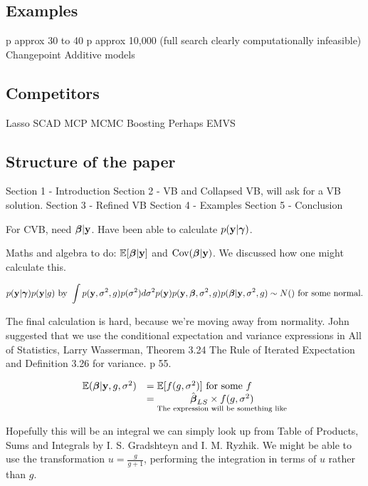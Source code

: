 \documentclass{amsart}
\begin{document}
\subsection{Examples}
p approx 30 to 40
p approx 10,000 (full search clearly computationally infeasible)
Changepoint
Additive models

\subsection{Competitors}
Lasso
SCAD
MCP
MCMC
Boosting
Perhaps EMVS

\subsection{Structure of the paper}
Section 1 - Introduction
Section 2 - VB and Collapsed VB, will ask for a VB solution.
Section 3 - Refined VB
Section 4 - Examples
Section 5 - Conclusion

For CVB, need ${\boldsymbol \beta} | {\bf y}$. Have been able to calculate $p({\bf y} | {\boldsymbol \gamma})$.

Maths and algebra to do: ${\mathbb E}[{\boldsymbol \beta} | {\bf y}]$ and $\text{Cov}({\boldsymbol \beta} | {\bf y})$. We discussed how one might
calculate this.

\begin{equation*}
p({\bf y} | {\boldsymbol \gamma})
p({\bf y} | g) \text{ by } \int p({\bf y}, \sigma^2, g) p(\sigma^2) d \sigma^2
p({\bf y})
p({\bf y}, {\boldsymbol \beta}, \sigma^2, g)
p({\boldsymbol \beta} | {\bf y}, \sigma^2, g) \sim N() \text{ for some normal.}
\end{equation*}

The final calculation is hard, because we're moving away from normality. John suggested that we use the
conditional expectation and variance expressions in All of Statistics, Larry Wasserman, Theorem 3.24 The Rule
of Iterated Expectation and Definition 3.26 for variance. p 55.

\begin{equation*}
\begin{array}{ll}
{\mathbb E}({\boldsymbol \beta} | {\bf y}, g, \sigma^2) &= {\mathbb E}[f(g, \sigma^2)] \text{ for some } f \\
&= \underset{\text{The expression will be something like}}{\hat{{\boldsymbol \beta}}_{LS} \times f(g, \sigma^2)}
\end{array}
\end{equation*}

Hopefully this will be an integral we can simply look up from Table of Products, Sums and Integrals by
I. S. Gradshteyn and I. M. Ryzhik. We might be able to use the transformation $u = \frac{g}{g + 1}$,
performing the integration in terms of $u$ rather than $g$.
\end{document}
